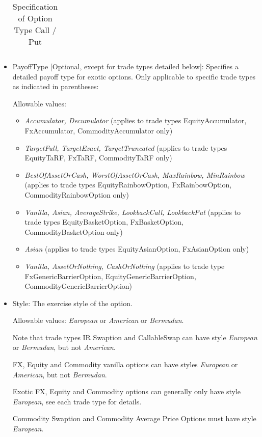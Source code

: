 \begin{itemize}
\begin{table}[H]
\begin{tabular} {|p{6cm}|p{8cm}|}
  \end{tabular}
  \caption{Specification of Option Type Call / Put}
  \label{tab:callput_specs}
\end{table}

\item PayoffType [Optional, except for trade types detailed below]: Specifies a detailed payoff type for exotic options. Only applicable to specific trade types as
  indicated in parentheses:

  Allowable values:
  \begin{itemize}
  \item \emph{Accumulator, Decumulator} (applies to trade types EquityAccumulator, FxAccumulator, CommodityAccumulator only)
  \item \emph{TargetFull, TargetExact, TargetTruncated} (applies to trade types EquityTaRF, FxTaRF, CommodityTaRF only)
  \item \emph{BestOfAssetOrCash, WorstOfAssetOrCash, MaxRainbow, MinRainbow} (applies to trade types EquityRainbowOption,
    FxRainbowOption, CommodityRainbowOption only)
  \item \emph{Vanilla, Asian, AverageStrike, LookbackCall, LookbackPut} (applies to trade types EquityBasketOption,
    FxBasketOption, CommodityBasketOption only)
  \item \emph{Asian} (applies to trade types EquityAsianOption, FxAsianOption only)
  \item \emph{Vanilla, AssetOrNothing, CashOrNothing} (applies to trade type FxGenericBarrierOption, EquityGenericBarrierOption, CommodityGenericBarrierOption)
  \end{itemize}

\item Style: The exercise style of the option. 

  Allowable values: \emph{European} or \emph{American} or \emph{Bermudan}. 
  
  Note that trade types IR Swaption and CallableSwap can have style
  \emph{European} or \emph{Bermudan}, but not \emph{American}.  
  
  FX, Equity and Commodity vanilla options can have styles \emph{European}
  or \emph{American}, but not \emph{Bermudan}. 
  
  Exotic FX, Equity and Commodity  options can generally only have style \emph{European}, see each trade type for details.
  
  Commodity Swaption and Commodity Average Price Options must have style \emph{European}. 
  

\end{itemize}
